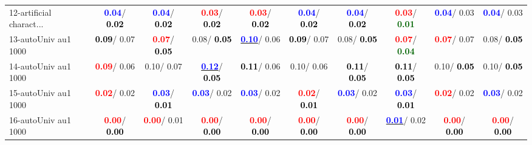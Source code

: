 \begin{table}[h]
\begin{center}
{\begin{tabular}{lc|c|c|c|c|c|c|c|c}
12-artificial charact... & \textcolor{blue}{\textbf{  0.04}}/\textcolor{black}{\textbf{  0.02}} & \textcolor{blue}{\textbf{  0.04}}/\textcolor{black}{\textbf{  0.02}} & \textcolor{red}{\textbf{  0.03}}/\textcolor{black}{\textbf{  0.02}} & \textcolor{red}{\textbf{  0.03}}/\textcolor{black}{\textbf{  0.02}} & \textcolor{blue}{\textbf{  0.04}}/\textcolor{black}{\textbf{  0.02}} & \textcolor{blue}{\textbf{  0.04}}/\textcolor{black}{\textbf{  0.02}} & \textcolor{red}{\textbf{  0.03}}/\textcolor{darkgreen}{\textbf{  0.01}} & \textcolor{blue}{\textbf{  0.04}}/  0.03 & \textcolor{blue}{\textbf{  0.04}}/  0.03 \\
13-autoUniv au1 1000 & \textcolor{black}{\textbf{  0.09}}/  0.07 & \textcolor{red}{\textbf{  0.07}}/\textcolor{black}{\textbf{  0.05}} &   0.08/\textcolor{black}{\textbf{  0.05}} & \underline{\textcolor{blue}{\textbf{  0.10}}}/  0.06 & \textcolor{black}{\textbf{  0.09}}/  0.07 &   0.08/\textcolor{black}{\textbf{  0.05}} & \textcolor{red}{\textbf{  0.07}}/\textcolor{darkgreen}{\textbf{  0.04}} & \textcolor{red}{\textbf{  0.07}}/  0.07 &   0.08/\textcolor{black}{\textbf{  0.05}} \\
14-autoUniv au1 1000 & \textcolor{red}{\textbf{  0.09}}/  0.06 &   0.10/  0.07 & \underline{\textcolor{blue}{\textbf{  0.12}}}/\textcolor{black}{\textbf{  0.05}} & \textcolor{black}{\textbf{  0.11}}/  0.06 &   0.10/  0.06 & \textcolor{black}{\textbf{  0.11}}/\textcolor{black}{\textbf{  0.05}} & \textcolor{black}{\textbf{  0.11}}/\textcolor{black}{\textbf{  0.05}} &   0.10/\textcolor{black}{\textbf{  0.05}} &   0.10/\textcolor{black}{\textbf{  0.05}} \\ \hline
15-autoUniv au1 1000 & \textcolor{red}{\textbf{  0.02}}/  0.02 & \textcolor{blue}{\textbf{  0.03}}/\textcolor{black}{\textbf{  0.01}} & \textcolor{blue}{\textbf{  0.03}}/  0.02 & \textcolor{blue}{\textbf{  0.03}}/  0.02 & \textcolor{red}{\textbf{  0.02}}/\textcolor{black}{\textbf{  0.01}} & \textcolor{blue}{\textbf{  0.03}}/  0.02 & \textcolor{blue}{\textbf{  0.03}}/\textcolor{black}{\textbf{  0.01}} & \textcolor{red}{\textbf{  0.02}}/  0.02 & \textcolor{blue}{\textbf{  0.03}}/  0.02 \\
16-autoUniv au1 1000 & \textcolor{red}{\textbf{  0.00}}/\textcolor{black}{\textbf{  0.00}} & \textcolor{red}{\textbf{  0.00}}/  0.01 & \textcolor{red}{\textbf{  0.00}}/\textcolor{black}{\textbf{  0.00}} & \textcolor{red}{\textbf{  0.00}}/\textcolor{black}{\textbf{  0.00}} & \textcolor{red}{\textbf{  0.00}}/\textcolor{black}{\textbf{  0.00}} & \textcolor{red}{\textbf{  0.00}}/\textcolor{black}{\textbf{  0.00}} & \underline{\textcolor{blue}{\textbf{  0.01}}}/  0.02 & \textcolor{red}{\textbf{  0.00}}/\textcolor{black}{\textbf{  0.00}} & \textcolor{red}{\textbf{  0.00}}/\textcolor{black}{\textbf{  0.00}} \\

\end{tabular}}
\end{center}
\end{table}
